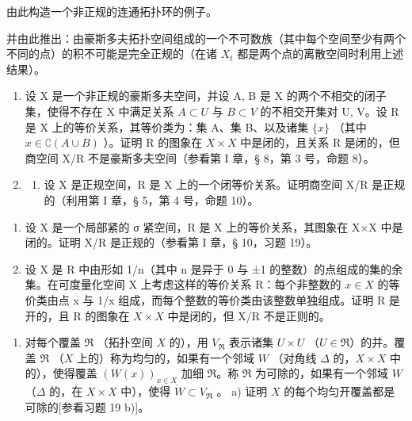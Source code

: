 由此构造一个非正规的连通拓扑环的例子。

并由此推出：由豪斯多夫拓扑空间组成的一个不可数族（其中每个空间至少有两个不同的点）的积不可能是完全正规的（在诸 \(X_{t}\) 都是两个点的离散空间时利用上述结果）。

\begin{enumerate}
\def\labelenumi{\arabic{enumi})}
\setcounter{enumi}{13}
\item
  设 X 是一个非正规的豪斯多夫空间，并设 A, B 是 X 的两个不相交的闭子集，使得不存在 X 中满足关系 \(A \subset U\) 与 \(B \subset V\) 的不相交开集对 U, V。设 R 是 X 上的等价关系，其等价类为：集 A、集 B、以及诸集 \(\{x\}\) （其中 \(x \in \complement(A \cup B)\) ）。证明 R 的图象在 \(X \times X\) 中是闭的，且关系 R 是闭的，但商空间 X/R 不是豪斯多夫空间（参看第 I 章，§ 8，第 3 号，命题 8）。
\item
  \begin{enumerate}
  \def\labelenumii{\alph{enumii})}
  \tightlist
  \item
    设 X 是正规空间，R 是 X 上的一个闭等价关系。证明商空间 X/R 是正规的（利用第 I 章，§ 5，第 4 号，命题 10）。
  \end{enumerate}
\end{enumerate}

\begin{enumerate}
\def\labelenumi{\alph{enumi})}
\setcounter{enumi}{1}
\item
  设 X 是一个局部紧的 σ 紧空间，R 是 X 上的等价关系，其图象在 X×X 中是闭的。证明 X/R 是正规的（参看第 I 章，§ 10，习题 19）。
\item
  设 X 是 R 中由形如 1/n（其中 n 是异于 0 与 ±1 的整数）的点组成的集的余集。在可度量化空间 X 上考虑这样的等价关系 R：每个非整数的 \(x \in X\) 的等价类由点 x 与 1/x 组成，而每个整数的等价类由该整数单独组成。证明 R 是开的，且 R 的图象在 \(X \times X\) 中是闭的，但 X/R 不是正则的。
\end{enumerate}

\begin{enumerate}
\def\labelenumi{\arabic{enumi})}
\setcounter{enumi}{15}
\tightlist
\item
  对每个覆盖 \(\Re\) （拓扑空间 \(X\) 的），用 \(V_{\Re}\) 表示诸集 \(U \times U\) （\(U \in \Re\)）的并。覆盖 \(\Re\) （\(X\) 上的）称为均匀的，如果有一个邻域 \(W\) （对角线 \(\Delta\) 的，\(X \times X\) 中的），使得覆盖 \((W(x))_{x \in X}\) 加细 \(\Re\)。称 \(\Re\) 为可除的，如果有一个邻域 \(W\) （\(\Delta\) 的，在 \(X \times X\) 中），使得 \(\dot{W} \subset V_{\Re}\) 。 a) 证明 \(X\) 的每个均匀开覆盖都是可除的{[}参看习题 19 b){]}。
\end{enumerate}

